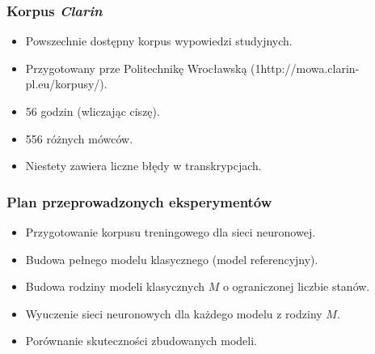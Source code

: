 \documentclass[mathserif, serif]{beamer}
\begin{document}
\begin{frame}
\begin{figure}
{
		}
	\end{figure}
		
	\end{frame}	

	\begin{frame}
		\frametitle{Korpus \textit{Clarin}}
		
		\begin{itemize}
			\item Powszechnie dostępny korpus wypowiedzi studyjnych.
			\item Przygotowany prze Politechnikę Wrocławską (1http://mowa.clarin-pl.eu/korpusy/).
			\item 56 godzin (wliczając ciszę).
			\item 556 różnych mówców.
			\item Niestety zawiera liczne błędy w transkrypcjach.
		\end{itemize}
		
	\end{frame}

	\begin{frame}
		\frametitle{Plan przeprowadzonych eksperymentów}
		
		\begin{itemize}
			\item Przygotowanie korpusu treningowego dla sieci neuronowej.
			\item Budowa pełnego modelu klasycznego (model referencyjny).
			\item Budowa rodziny modeli klasycznych $M$ o ograniczonej liczbie stanów.
			\item Wyuczenie sieci neuronowych dla każdego modelu z rodziny $M$.
			\item Porównanie skuteczności zbudowanych modeli.
		\end{itemize}
	
	\end{frame}
\end{document}
